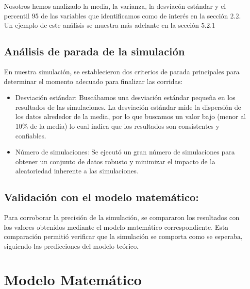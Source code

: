 \documentclass[11pt]{article}
\begin{document}
    Nosotros hemos analizado la media, la varianza, la desviacón estándar y el percentil 95 de las variables que identificamos
    como de interés en la sección 2.2. Un ejemplo de este análisis se muestra más adelante en la sección 5.2.1


    \subsection{Análisis de parada de la simulación}
    En nuestra simulación, se establecieron dos criterios de parada principales para determinar el momento adecuado para finalizar las corridas:

    \begin{itemize}
    \item Desviación estándar: Buscábamos una desviación estándar pequeña en los resultados de las simulaciones. La desviación estándar mide la dispersión de los datos alrededor de la media, por lo que buscamos un valor bajo (menor al 10\% de la media) lo cual indica que los resultados son consistentes y confiables.

    \item Número de simulaciones: Se ejecutó un gran número de simulaciones para obtener un conjunto de datos robusto y minimizar el impacto de la aleatoriedad inherente a las simulaciones.
    \end{itemize}

    \subsection{Validación con el modelo matemático:}

    Para corroborar la precisión de la simulación, se compararon los resultados con los valores obtenidos mediante el modelo matemático correspondiente. Esta comparación permitió verificar que la simulación se comporta como se esperaba, siguiendo las predicciones del modelo teórico.




    \section{Modelo Matemático}
\end{document}
